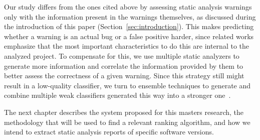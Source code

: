 Our study differs from the ones cited above by assessing static analysis
warnings only with the information present in the warnings themselves, as
discussed during the introduction of this paper
(Section~\ref{sec:introduction}).  This makes predicting whether a warning is
an actual bug or a false positive harder, since related works emphasize that
the most important characteristics to do this are internal to the analyzed
project. To compensate for this, we use multiple static analyzers to generate
more information and correlate the information provided by them to better
assess the correctness of a given warning.  Since this strategy still might
result in a low-quality classifier, we turn to ensemble techniques to generate
and combine multiple weak classifiers generated this way into a stronger
one~\cite{aima}.

The next chapter describes the system proposed for this masters research, the
methodology that will be used to find a relevant ranking algorithm, and how we
intend to extract static analysis reports of specific software versions.
